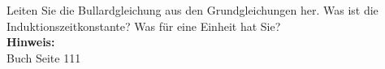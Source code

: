 \begin{question}[section=4,subsection=41,name={Bullard Gleichung},difficulty=,type=mdl,tags={}]
	Leiten Sie die Bullardgleichung aus den Grundgleichungen her. Was ist die Induktionszeitkonstante? Was für eine Einheit hat Sie?
	\\ \textbf{Hinweis:}\\
	Buch Seite 111
\end{question}
\begin{solution}
	
\end{solution}